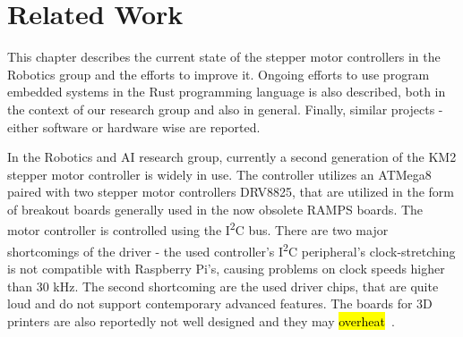 \chapter{Related Work}
\label{ch:related_work}
This chapter describes the current state of the stepper motor controllers in the Robotics group and the efforts to improve it.
Ongoing efforts to use program embedded systems in the Rust programming language is also described, both in the context of our research group and also in general.
Finally, similar projects - either software or hardware wise are reported.

In the Robotics and AI research group, currently a second generation of the KM2 stepper motor controller is widely in use.
The controller utilizes an ATMega8 paired with two stepper motor controllers DRV8825, that are utilized in the form of breakout boards generally used in the now obsolete RAMPS boards.
The motor controller is controlled using the I\textsuperscript{2}C bus.
There are two major shortcomings of the driver - the used controller's I\textsuperscript{2}C peripheral's clock-stretching is not compatible with Raspberry Pi's, causing problems on clock speeds higher than 30 kHz.
The second shortcoming are the used driver chips, that are quite loud and do not support contemporary advanced features.
The boards for 3D printers are also reportedly not well designed and they may \hl{overheat}~\cite{prusa_rambo}.




